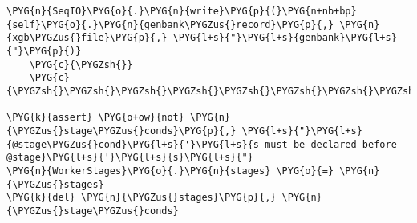 \begin{Verbatim}[commandchars=\\\{\}]
        \PYG{n}{SeqIO}\PYG{o}{.}\PYG{n}{write}\PYG{p}{(}\PYG{n+nb+bp}{self}\PYG{o}{.}\PYG{n}{genbank\PYGZus{}record}\PYG{p}{,} \PYG{n}{xgb\PYGZus{}file}\PYG{p}{,} \PYG{l+s}{"}\PYG{l+s}{genbank}\PYG{l+s}{"}\PYG{p}{)}
    \PYG{c}{\PYGZsh{}}
    \PYG{c}{\PYGZsh{}\PYGZsh{}\PYGZsh{}\PYGZsh{}\PYGZsh{}\PYGZsh{}\PYGZsh{}\PYGZsh{}\PYGZsh{}\PYGZsh{}\PYGZsh{}\PYGZsh{}\PYGZsh{}\PYGZsh{}\PYGZsh{}\PYGZsh{}\PYGZsh{}\PYGZsh{}\PYGZsh{}\PYGZsh{}\PYGZsh{}\PYGZsh{}\PYGZsh{}\PYGZsh{}\PYGZsh{}\PYGZsh{}\PYGZsh{}\PYGZsh{}\PYGZsh{}\PYGZsh{}\PYGZsh{}\PYGZsh{}\PYGZsh{}\PYGZsh{}\PYGZsh{}\PYGZsh{}\PYGZsh{}\PYGZsh{}\PYGZsh{}\PYGZsh{}\PYGZsh{}\PYGZsh{}\PYGZsh{}\PYGZsh{}\PYGZsh{}\PYGZsh{}\PYGZsh{}\PYGZsh{}\PYGZsh{}\PYGZsh{}\PYGZsh{}\PYGZsh{}\PYGZsh{}\PYGZsh{}\PYGZsh{}\PYGZsh{}\PYGZsh{}\PYGZsh{}\PYGZsh{}\PYGZsh{}\PYGZsh{}\PYGZsh{}\PYGZsh{}\PYGZsh{}\PYGZsh{}\PYGZsh{}\PYGZsh{}\PYGZsh{}\PYGZsh{}\PYGZsh{}\PYGZsh{}\PYGZsh{}\PYGZsh{}\PYGZsh{}\PYGZsh{}\PYGZsh{}}

\PYG{k}{assert} \PYG{o+ow}{not} \PYG{n}{\PYGZus{}stage\PYGZus{}conds}\PYG{p}{,} \PYG{l+s}{"}\PYG{l+s}{@stage\PYGZus{}cond}\PYG{l+s}{'}\PYG{l+s}{s must be declared before @stage}\PYG{l+s}{'}\PYG{l+s}{s}\PYG{l+s}{"}
\PYG{n}{WorkerStages}\PYG{o}{.}\PYG{n}{stages} \PYG{o}{=} \PYG{n}{\PYGZus{}stages}
\PYG{k}{del} \PYG{n}{\PYGZus{}stages}\PYG{p}{,} \PYG{n}{\PYGZus{}stage\PYGZus{}conds}
\end{Verbatim}

